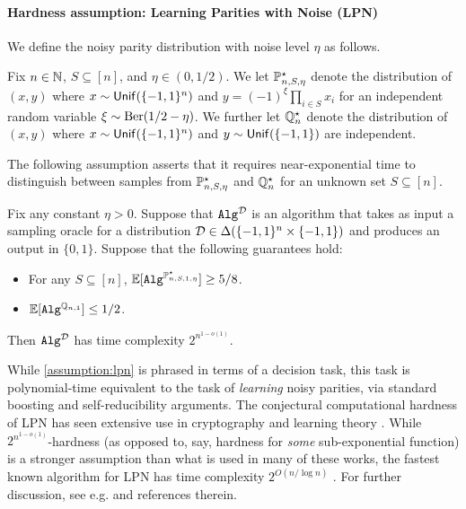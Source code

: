 \paragraph{Hardness assumption: Learning Parities with Noise (LPN)}
We define the noisy parity distribution with noise level $\eta$ as follows.
\begin{definition}
  \label{def:parity}
Fix $n \in \mathbb{N}$, $S\subseteq [n]$, and $\eta \in (0, 1/2)$. We let $\mathbb{P}^\star_{n,S,\eta}$ denote the distribution of $(x,y)$ where $x \sim \mathsf{Unif}(\{-1,1\}^n)$ and $y = (-1)^\xi \prod_{i\in S} x_i$ for an independent random variable $\xi \sim \mathrm{Ber}(1/2-\eta)$. We further let $\mathbb{Q}^\star_n$ denote the distribution of $(x,y)$ where $x\sim \mathsf{Unif}(\{-1,1\}^n)$ and $y \sim \mathsf{Unif}(\{-1,1\})$ are independent.
\end{definition}

The following assumption asserts that it requires near-exponential time to distinguish between samples from $\mathbb{P}^\star_{n,S,\eta}$ and $\mathbb{Q}^\star_{n}$ for an unknown set $S \subseteq [n]$.

\begin{assumption}\label{assumption:lpn}
Fix any constant $\eta>0$. Suppose that $\texttt{Alg}^{\mathcal{D}}$ is an algorithm that takes as input a sampling oracle for a distribution $\mathcal{D} \in \Delta(\{-1,1\}^n \times \{-1,1\})$ and produces an output in $\{0,1\}$. Suppose that the following guarantees hold:
\begin{itemize}
\item For any $S \subseteq [n]$, $\operatorname*{\mathbb{E}}[\texttt{Alg}^{\mathbb{P}^\star_{n,S,1,\eta}}] \geq 5/8$.
\item $\operatorname*{\mathbb{E}}[\texttt{Alg}^{\mathbb{Q}_{n,1}}] \leq 1/2$.
\end{itemize}
Then $\texttt{Alg}^{\mathcal{D}}$ has time complexity $2^{n^{1-o(1)}}$.
\end{assumption}

While \cref{assumption:lpn} is phrased in terms of a decision task, this task is polynomial-time equivalent to the task of \emph{learning} noisy parities, via standard boosting and self-reducibility arguments. The conjectural computational hardness of LPN has seen extensive use in cryptography \citep{alekhnovich2003more,applebaum2009fast,pietrzak2012cryptography} and learning theory \citep{kearns1994learnability,mossel2005learning,golowich2024exploration}.  While $2^{n^{1-o(1)}}$-hardness (as opposed to, say, hardness for \emph{some} sub-exponential function) is a stronger assumption than what is used in many of these works, the fastest known algorithm for LPN has time complexity $2^{O(n/\log n)}$ \citep{blum2003noise}.  For further discussion, see e.g. \cite{yu2021smoothing} and references therein.\loose

